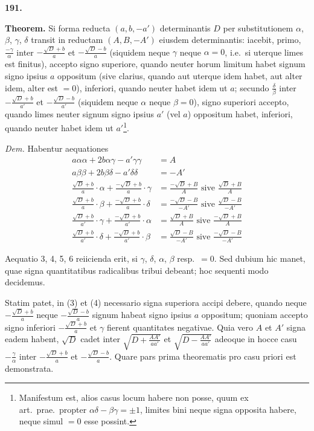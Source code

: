 \documentclass[12pt,a4paper]{article}
\theoremstyle{plain}
\begin{document}
\bigskip

\textbf{191.}

\textbf{Theorem.} Si forma reducta $(a, b, -a')$ determinantis $D$ per substitutionem $\alpha$, $\beta$, $\gamma$, $\delta$ transit in reductam $(A, B, -A')$ eiusdem determinantis: iacebit, primo, $\frac{-\gamma}{\alpha}$ inter $-\frac{\sqrt{D} + b}{a}$ et $-\frac{\sqrt{D} - b}{a}$ (siquidem neque $\gamma$ neque $\alpha = 0$, i.e.~si uterque limes est finitus), accepto signo superiore, quando neuter horum limitum habet signum signo ipsius $a$ oppositum (sive clarius, quando aut uterque idem habet, aut alter idem, alter est $= 0$), inferiori, quando neuter habet idem ut $a$; secundo $\frac{\delta}{\beta}$ inter $-\frac{\sqrt{D} + b}{a'}$ et $-\frac{\sqrt{D} - b}{a'}$ (siquidem neque $\alpha$ neque $\beta = 0$), signo superiori accepto, quando limes neuter signum signo ipsius $a'$ (vel $a$) oppositum habet, inferiori, quando neuter habet idem ut $a'$\footnote{Manifestum est, alios casus locum habere non posse, quum ex art.~prae.~propter $\alpha\delta - \beta\gamma = \pm 1$, limites bini neque signa opposita habere, neque simul $= 0$ esse possint.}.

\textit{Dem.} Habentur aequationes
\begin{align*}
a\alpha\alpha + 2b\alpha\gamma - a'\gamma\gamma &= A \tag{1}\\
a\beta\beta + 2b\beta\delta - a'\delta\delta &= -A' \tag{2}\\
\frac{\sqrt{D} + b}{a} \cdot \alpha + \frac{-\sqrt{D} + b}{a} \cdot \gamma &= \frac{-\sqrt{D} + B}{A} \text{ sive } \frac{\sqrt{D} + B}{A} \tag{3}\\
\frac{\sqrt{D} + b}{a} \cdot \beta + \frac{-\sqrt{D} + b}{a} \cdot \delta &= \frac{-\sqrt{D} - B}{-A'} \text{ sive } \frac{\sqrt{D} - B}{-A'} \tag{4}\\
\frac{\sqrt{D} + b}{a'} \cdot \gamma + \frac{-\sqrt{D} + b}{a'} \cdot \alpha &= \frac{\sqrt{D} + B}{A} \text{ sive } \frac{-\sqrt{D} + B}{A} \tag{5}\\
\frac{\sqrt{D} + b}{a'} \cdot \delta + \frac{-\sqrt{D} + b}{a'} \cdot \beta &= \frac{\sqrt{D} - B}{-A'} \text{ sive } \frac{-\sqrt{D} - B}{-A'} \tag{6}
\end{align*}

Aequatio 3, 4, 5, 6 reiicienda erit, si $\gamma$, $\delta$, $\alpha$, $\beta$ resp.~$= 0$. Sed dubium hic manet, quae signa quantitatibus radicalibus tribui debeant; hoc sequenti modo decidemus.

Statim patet, in (3) et (4) necessario signa superiora accipi debere, quando neque $-\frac{\sqrt{D} + b}{a}$ neque $-\frac{\sqrt{D} - b}{a}$ signum habeat signo ipsius $a$ oppositum; quoniam accepto signo inferiori $-\frac{\sqrt{D} + b}{a}$ et $\gamma$ fierent quantitates negativae. Quia vero $A$ et $A'$ signa eadem habent, $\sqrt{D}$ cadet inter $\sqrt{D + \frac{AA'}{aa'}}$ et $\sqrt{D - \frac{AA'}{aa'}}$ adeoque in hocce casu $-\frac{\gamma}{\alpha}$ inter $-\frac{\sqrt{D} + b}{a}$ et $-\frac{\sqrt{D} - b}{a}$. Quare pars prima theorematis pro casu priori est demonstrata.
\end{document}
